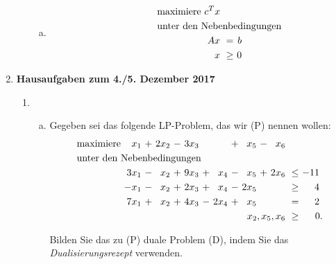 \documentclass[11pt, a4paper]{article}
\begin{document}
\begin{enumerate}[\bfseries A:]
\begin{enumerate}[\bfseries 1.]
\begin{enumerate}[a)]
\item \begin{align*}
\begin{alignedat}{3}
& \text{maximiere } & c^Tx & & \\
& \rlap{unter den Nebenbedingungen} & & & \\
&& Ax &\ = &\ b \\
&& x &\ \geq &\ 0
\end{alignedat}
\end{align*}
\end{enumerate}

\end{enumerate}


\item \textbf{Hausaufgaben zum 4./5. Dezember 2017}

\begin{enumerate}[\bfseries 1.]

\item \begin{enumerate}[a)]
\item Gegeben sei das folgende LP-Problem, das wir (P) nennen wollen:
\begin{align*}
\begin{alignedat}{8}
& \text{maximiere } &  x_1 &\ + &\ 2x_2 &\ - &\ 3x_3 & & &\ + &\ x_5 &\ - & x_6 & \\
& \rlap{unter den Nebenbedingungen} & & & & & & & & & & & \\
&& 3x_1 &\ - &\  x_2 &\ + &\ 9x_3 &\ + &\  x_4 &\ - &\  x_5 &\ + &\ 2x_6 &\ \leq &\ -11\ \\
&& -x_1 &\ - &\  x_2 &\ + &\ 2x_3 &\ + &\  x_4 &\ - &\ 2x_5 &    &       &\ \geq &\   4\ \\
&& 7x_1 &\ + &\  x_2 &\ + &\ 4x_3 &\ - &\ 2x_4 &\ + &\  x_5 &    &       &\ =    &\   2\ \\
&& &&&&&&&&&& \llap{$x_2,x_5,x_6$} &\ \geq &\ 0.
\end{alignedat}
\end{align*}

Bilden Sie das zu (P) duale Problem (D), indem Sie das \textit{Dualisierungsrezept} verwenden.


\end{enumerate}
\end{enumerate}
\end{enumerate}
\end{document}
